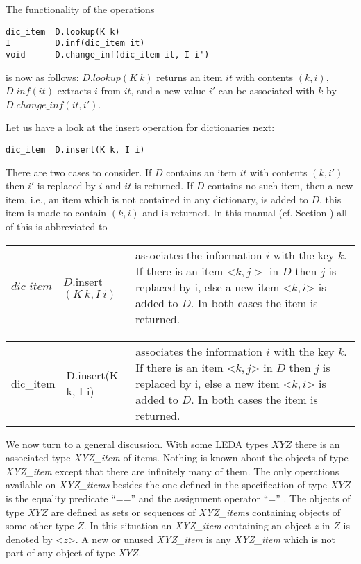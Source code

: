 The functionality of the operations 

\begin{verbatim}
dic_item  D.lookup(K k)
I         D.inf(dic_item it)
void      D.change_inf(dic_item it, I i')
\end{verbatim}

is now as follows: $D.\mathit{lookup}(K\ k)$ returns an item $it$ with contents $(k,i)$,
$D.\mathit{inf}(it)$ extracts $i$ from $it$, and a new value $i'$ can be associated
with $k$ by $D.\mathit{change{\_}inf}(it,i')$.

Let us have a look at the insert operation for dictionaries next:

\begin{verbatim}
dic_item  D.insert(K k, I i)
\end{verbatim}

There are two cases to consider. If $D$ contains an item $it$ with contents
$(k,i')$ then $i'$ is replaced by $i$ and $it$ is returned. If $D$ contains no
such item, then a new item, i.e., an item which is not contained in any
dictionary, is added to $D$, this item is made to contain $(k,i)$ and is
returned. In this manual (cf. Section ) all of this is
abbreviated to
\smallskip

\begin{latexonly}
\newlength{\thiscallwidth} 
\addtolength{\thiscallwidth}{-\textwidth} 
\begin{tabular}{lll}
$\mathit{dic\_item}$ & $D.$insert$(K\ k, I\ i)$ &
\parbox[t]{-\thiscallwidth}{
associates the information $i$ with the key $k$. If there is an
item <$k,j>$ in $D$ then $j$ is replaced by i, else a new item 
<$k,i$> is added to $D$. In both cases the item is returned.}
\end{tabular}
\end{latexonly}
\begin{htmlonly}
\begin{tabular}{lll}
dic\_item & D.insert(K k, I i) &
associates the information $i$ with the key $k$. If there is an
item <$k,j$>{} in $D$ then $j$ is replaced by i, else a new item 
<$k,i$>{} is added to $D$. In both cases the item is returned.
\end{tabular}
\end{htmlonly}
\smallskip

We now turn to a general discussion. With some LEDA types $XYZ$ there is an
associated type {\it XYZ\_item} of items. Nothing is known about the objects of
type {\it XYZ\_item} except that there are infinitely many of them. The only
operations available on {\it XYZ\_items} besides the one defined in the
specification of type $XYZ$ is the equality predicate ``=='' and the assignment
operator ``='' . The objects of type $XYZ$ are defined as sets or sequences of
{\it XYZ\_items} containing objects of some other type $Z$. In this situation
an {\it XYZ\_item} containing an object $z$ in $Z$ is denoted by <$z$>. A new
or unused {\it XYZ\_item} is any {\it XYZ\_item} which is not part of any
object of type $XYZ$.

